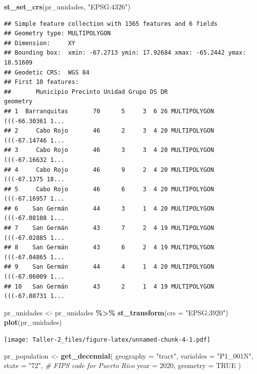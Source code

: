\documentclass[
]{article}
\newenvironment{Shaded}{\begin{snugshade}}{\end{snugshade}}
\newcommand{\AttributeTok}[1]{\textcolor[rgb]{0.13,0.29,0.53}{#1}}
\newcommand{\CommentTok}[1]{\textcolor[rgb]{0.56,0.35,0.01}{\textit{#1}}}
\newcommand{\ConstantTok}[1]{\textcolor[rgb]{0.56,0.35,0.01}{#1}}
\newcommand{\DecValTok}[1]{\textcolor[rgb]{0.00,0.00,0.81}{#1}}
\newcommand{\FunctionTok}[1]{\textcolor[rgb]{0.13,0.29,0.53}{\textbf{#1}}}
\newcommand{\NormalTok}[1]{#1}
\newcommand{\OtherTok}[1]{\textcolor[rgb]{0.56,0.35,0.01}{#1}}
\newcommand{\SpecialCharTok}[1]{\textcolor[rgb]{0.81,0.36,0.00}{\textbf{#1}}}
\newcommand{\StringTok}[1]{\textcolor[rgb]{0.31,0.60,0.02}{#1}}
\begin{document}
\begin{Shaded}
\begin{Highlighting}[]
\FunctionTok{st\_set\_crs}\NormalTok{(pr\_unidades, }\StringTok{"EPSG:4326"}\NormalTok{)}
\end{Highlighting}
\end{Shaded}

\begin{verbatim}
## Simple feature collection with 1365 features and 6 fields
## Geometry type: MULTIPOLYGON
## Dimension:     XY
## Bounding box:  xmin: -67.2713 ymin: 17.92684 xmax: -65.2442 ymax: 18.51609
## Geodetic CRS:  WGS 84
## First 10 features:
##       Municipio Precinto Unidad Grupo DS DR                       geometry
## 1  Barranquitas       70      5     3  6 26 MULTIPOLYGON (((-66.30361 1...
## 2     Cabo Rojo       46      2     3  4 20 MULTIPOLYGON (((-67.14746 1...
## 3     Cabo Rojo       46      3     3  4 20 MULTIPOLYGON (((-67.16632 1...
## 4     Cabo Rojo       46      9     2  4 20 MULTIPOLYGON (((-67.1375 18...
## 5     Cabo Rojo       46      6     3  4 20 MULTIPOLYGON (((-67.16957 1...
## 6    San Germán       44      3     1  4 20 MULTIPOLYGON (((-67.08108 1...
## 7    San Germán       43      7     2  4 19 MULTIPOLYGON (((-67.02885 1...
## 8    San Germán       43      6     2  4 19 MULTIPOLYGON (((-67.04865 1...
## 9    San Germán       44      4     1  4 20 MULTIPOLYGON (((-67.06009 1...
## 10   San Germán       43      2     1  4 19 MULTIPOLYGON (((-67.08731 1...
\end{verbatim}

\begin{Shaded}
\begin{Highlighting}[]
\NormalTok{pr\_unidades }\OtherTok{\textless{}{-}}\NormalTok{ pr\_unidades }\SpecialCharTok{\%\textgreater{}\%} \FunctionTok{st\_transform}\NormalTok{(}\AttributeTok{crs =} \StringTok{"EPSG:3920"}\NormalTok{)}
\FunctionTok{plot}\NormalTok{(pr\_unidades)}
\end{Highlighting}
\end{Shaded}

\texttt{[image: Taller-2\_files/figure-latex/unnamed-chunk-4-1.pdf]}

\begin{Shaded}
\begin{Highlighting}[]
\NormalTok{pr\_population }\OtherTok{\textless{}{-}} \FunctionTok{get\_decennial}\NormalTok{(}
  \AttributeTok{geography =} \StringTok{"tract"}\NormalTok{, }
  \AttributeTok{variables =} \StringTok{"P1\_001N"}\NormalTok{, }
  \AttributeTok{state =} \StringTok{"72"}\NormalTok{,   }\CommentTok{\# FIPS code for Puerto Rico}
  \AttributeTok{year =} \DecValTok{2020}\NormalTok{, }
  \AttributeTok{geometry =} \ConstantTok{TRUE}
\NormalTok{)}
\end{Highlighting}
\end{Shaded}
\end{document}
